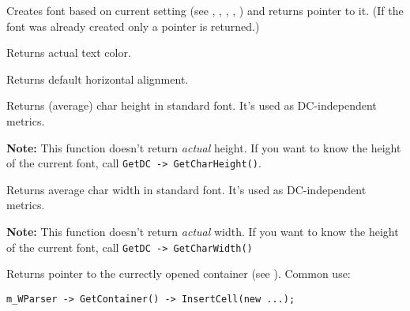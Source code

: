 
Creates font based on current setting (see
,
,
,
,
)
and returns pointer to it.
(If the font was already created only a pointer is returned.)


\label{wxhtmlwinparsergetactualcolor}


Returns actual text color.

\label{wxhtmlwinparsergetalign}


Returns default horizontal alignment.

\label{wxhtmlwinparsergetcharheight}


Returns (average) char height in standard font. It's used as DC-independent metrics.

{\bf Note:} This function doesn't return {\it actual} height. If you want to
know the height of the current font, call {\tt GetDC -> GetCharHeight()}.

\label{wxhtmlwinparsergetcharwidth}


Returns average char width in standard font. It's used as DC-independent metrics.

{\bf Note:} This function doesn't return {\it actual} width. If you want to
know the height of the current font, call {\tt GetDC -> GetCharWidth()}

\label{wxhtmlwinparsergetcontainer}


Returns pointer to the currectly opened container (see ).
Common use:

\begin{verbatim}
m_WParser -> GetContainer() -> InsertCell(new ...);
\end{verbatim}

